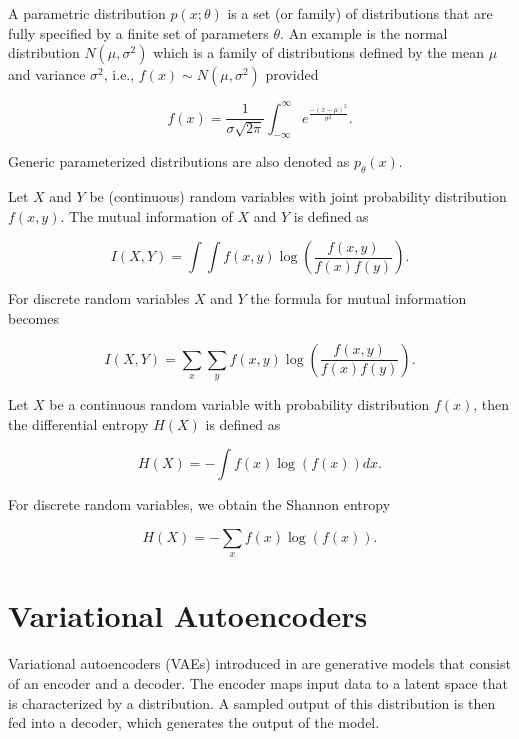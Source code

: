 \documentclass[11pt]{article}
\begin{document}
A parametric distribution $p(x;\theta)$ is a set (or family) of distributions that are fully specified by a finite set of parameters $\theta$. An example is the normal distribution $N(\mu, \sigma^{2})$ which is a family of distributions defined by the mean $\mu$ and variance $\sigma^{2}$, i.e., $f(x)\sim N(\mu, \sigma^{2})$ provided

\begin{equation}
    f(x) = \frac{1}{\sigma\sqrt{2\pi}}\int_{-\infty}^{\infty}e^{\frac{-(x-\mu)^{2}}{\sigma^{2}}}.
\end{equation}

Generic parameterized distributions are also denoted as $p_{\theta}(x)$.

Let $X$ and $Y$ be (continuous) random variables with joint probability distribution $f(x,y)$. The mutual information of $X$ and $Y$ is defined as

\begin{equation}
I(X,Y) = \int\int f(x,y)\log\left(\frac{f(x,y)}{f(x)f(y)}\right).
\label{eq:MutualInformation}
\end{equation}

For discrete random variables $X$ and $Y$ the formula for mutual information becomes

\begin{equation}
I(X,Y) = \sum_{x}\sum_{y} f(x,y)\log\left(\frac{f(x,y)}{f(x)f(y)}\right).
\label{eq:MutualInformation}
\end{equation}

Let $X$ be a continuous random variable with probability distribution $f(x)$, then the differential entropy $H(X)$ is defined as

\begin{equation}
H(X) = -\int f(x)\log(f(x)) dx.
\label{eq:DifferentialEntropy}
\end{equation}

For discrete random variables, we obtain the Shannon entropy

\begin{equation}
H(X) = -\sum_{x}f(x)\log(f(x)).
\label{eq:ShannonEntropy}
\end{equation}


\section{Variational Autoencoders}
Variational autoencoders (VAEs) introduced in \cite{kingma_auto-encoding_2014} are generative models that consist of an encoder and a decoder. The encoder maps input data to a latent space that is characterized by a distribution. A sampled output of this distribution is then fed into a decoder, which generates the output of the model.
\end{document}
